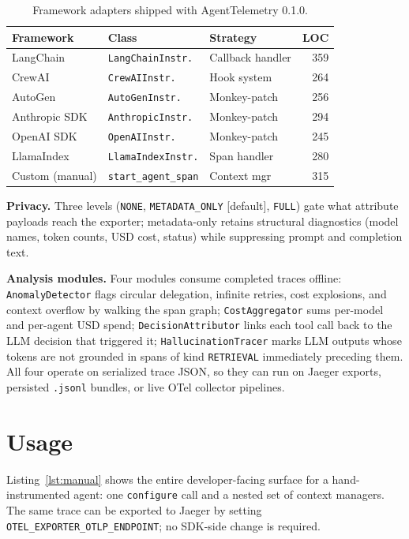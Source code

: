 \documentclass[10pt,conference]{IEEEtran}
\begin{document}
\begin{table}[t]
\caption{Framework adapters shipped with AgentTelemetry 0.1.0.}
\label{tab:adapters}
\centering\footnotesize
\setlength{\tabcolsep}{4pt}
\begin{tabular}{@{}l l l r@{}}
\toprule
\textbf{Framework} & \textbf{Class} & \textbf{Strategy} & \textbf{LOC}\\
\midrule
LangChain     & \texttt{LangChainInstr.}  & Callback handler & 359\\
CrewAI        & \texttt{CrewAIInstr.}     & Hook system      & 264\\
AutoGen       & \texttt{AutoGenInstr.}    & Monkey-patch     & 256\\
Anthropic SDK & \texttt{AnthropicInstr.}  & Monkey-patch     & 294\\
OpenAI SDK    & \texttt{OpenAIInstr.}     & Monkey-patch     & 245\\
LlamaIndex    & \texttt{LlamaIndexInstr.} & Span handler     & 280\\
Custom (manual) & \texttt{start\_agent\_span} & Context mgr  & 315\\
\bottomrule
\end{tabular}
\end{table}

\textbf{Privacy.} Three levels (\texttt{NONE},
\texttt{METADATA\_ONLY} [default], \texttt{FULL}) gate what
attribute payloads reach the exporter; metadata-only retains
structural diagnostics (model names, token counts, USD cost,
status) while suppressing prompt and completion text.

\textbf{Analysis modules.} Four modules consume completed traces
offline:
\texttt{AnomalyDetector} flags circular delegation, infinite
retries, cost explosions, and context overflow by walking the
span graph;
\texttt{CostAggregator} sums per-model and per-agent USD spend;
\texttt{DecisionAttributor} links each tool call back to the LLM
decision that triggered it;
\texttt{HallucinationTracer} marks LLM outputs whose tokens are
not grounded in spans of kind \texttt{RETRIEVAL} immediately
preceding them. All four operate on serialized
trace JSON, so they can run on Jaeger exports, persisted
\texttt{.jsonl} bundles, or live OTel collector pipelines.

\section{Usage}
\label{sec:usage}

Listing~\ref{lst:manual} shows the entire developer-facing surface
for a hand-instrumented agent: one \texttt{configure} call and a
nested set of context managers. The same trace can be exported to
Jaeger by setting \texttt{OTEL\_EXPORTER\_OTLP\_ENDPOINT}; no
SDK-side change is required.
\end{document}
